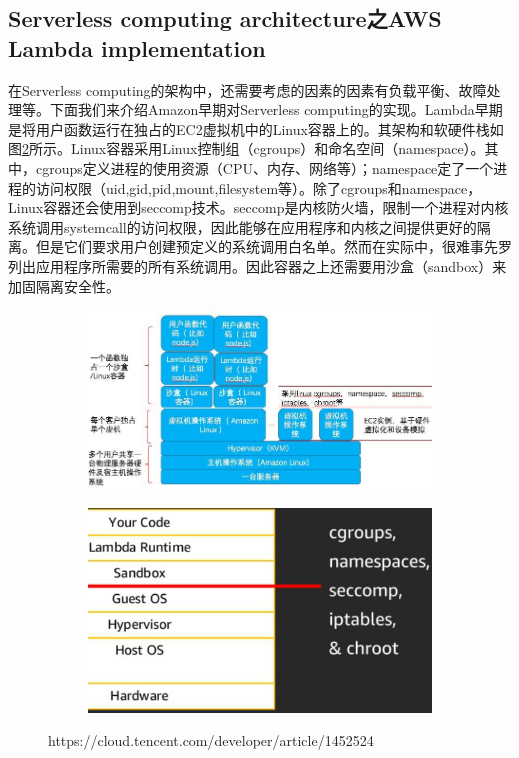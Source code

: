 \documentclass[11pt]{article}
\begin{document}
\subsection{Serverless computing architecture之AWS Lambda implementation}
在Serverless computing的架构中，还需要考虑的因素的因素有负载平衡、故障处理等。下面我们来介绍Amazon早期对Serverless computing的实现。Lambda早期是将用户函数运行在独占的EC2虚拟机中的Linux容器上的。其架构和软硬件栈如图\ref{figs:arch}所示。Linux容器采用Linux控制组（cgroups）和命名空间（namespace）。其中，cgroups定义进程的使用资源（CPU、内存、网络等）；namespace定了一个进程的访问权限（uid,gid,pid,mount,filesystem等）。除了cgroups和namespace，Linux容器还会使用到seccomp技术。seccomp是内核防火墙，限制一个进程对内核系统调用systemcall的访问权限，因此能够在应用程序和内核之间提供更好的隔离。但是它们要求用户创建预定义的系统调用白名单。然而在实际中，很难事先罗列出应用程序所需要的所有系统调用。因此容器之上还需要用沙盒（sandbox）来加固隔离安全性。
\begin{figure}[!htbp]
	\begin{subfigure}[b]{0.49\linewidth}
		\includegraphics[width=\linewidth,height=0.21\textheight]{figs/arch}
		\caption{}	
	\end{subfigure}
	\begin{subfigure}[b]{0.49\linewidth}
		\includegraphics[width=\linewidth]{figs/stack_0}
		\caption{}
		\label{figs:stack_0}
	\end{subfigure}
	\caption{https://cloud.tencent.com/developer/article/1452524}
	\label{figs:arch}
\end{figure}
\end{document}
